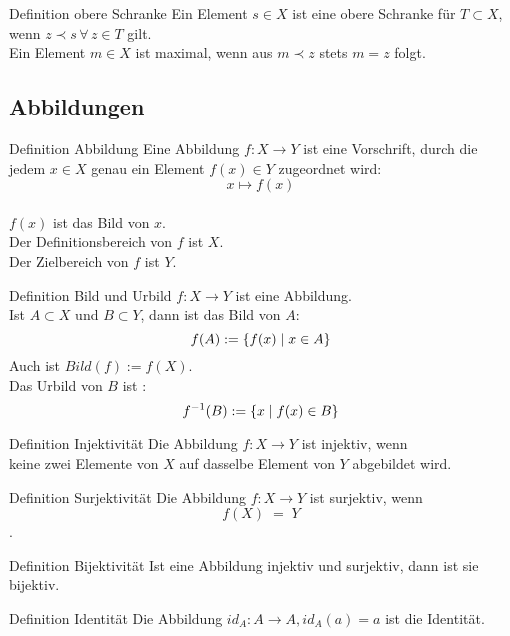 \documentclass[a6paper,11pt,print,grid=front]{kartei}
\begin{document}
\begin{karte}{Definition obere Schranke}
    Ein Element \( s \in X \) ist eine obere Schranke für 
    \( T \subset X \), wenn \( z \prec s \,\forall \, z \in T \) 
    gilt.\\
    Ein Element \( m \in X \) ist maximal, wenn aus 
    \( m \prec z \) stets \( m = z \) folgt.
\end{karte}
\subsection*{Abbildungen}
\begin{karte}{Definition Abbildung}
    Eine Abbildung \(f : X \rightarrow Y\) ist eine Vorschrift, 
    durch die jedem \(x \in X \) genau ein Element \(f(x) \in Y\)
    zugeordnet wird:  \\
    \[ x \mapsto f(x)\] \\
     \( f(x)\) ist das Bild von \(x\). \\
    Der Definitionsbereich von \(f\) ist \(X\). \\
    Der Zielbereich von \(f\) ist \(Y\). 
\end{karte}
\begin{karte}{Definition Bild und Urbild}
    \(f : X \rightarrow Y\) ist eine Abbildung. \\
    Ist \(A \subset X\) und \(B \subset Y\),
     dann ist das Bild von \(A\):
    \[f(A) := \{ f(x) \;\vert \; x \in A \}\]
    Auch ist \(Bild(f) := f(X)\). \\
    Das Urbild von \(B\) ist : 
    \[f^{-1}(B) := \{x \;\vert \; f(x) \in B\}\]
\end{karte}
\begin{karte}{Definition Injektivität}
Die Abbildung \(f: X \rightarrow Y\) ist injektiv, wenn \\
keine zwei Elemente von \(X\) auf dasselbe Element von \(Y\) abgebildet wird. 
\end{karte}
\begin{karte}{Definition Surjektivität}
    Die Abbildung \(f: X \rightarrow Y\) ist surjektiv, wenn \\
    \[ f(X) \; = \; Y\].
\end{karte} 
\begin{karte}{Definition Bijektivität}
    Ist eine Abbildung injektiv und surjektiv, dann ist sie bijektiv. 
\end{karte}
\begin{karte}{Definition Identität}
    Die Abbildung \(id_A : A \rightarrow A, id_A(a) = a\) ist die Identität.
\end{karte}
\end{document}
